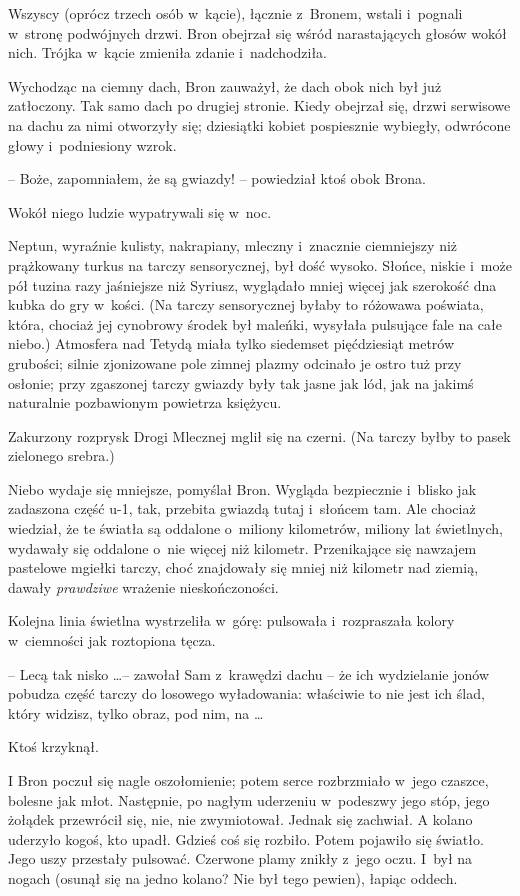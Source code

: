 \documentclass[oneside,polish,11pt,rmheadings]{mwbk}
\begin{document}
Wszyscy (oprócz trzech osób w~kącie), łącznie z~Bronem, wstali i~pognali w~stronę podwójnych drzwi. Bron obejrzał się wśród narastających głosów wokół nich. Trójka w~kącie zmieniła zdanie i~nadchodziła. 

Wychodząc na ciemny dach, Bron zauważył, że dach obok nich był już zatłoczony. Tak samo dach po drugiej stronie. Kiedy obejrzał się, drzwi serwisowe na dachu za nimi otworzyły się; dziesiątki kobiet pospiesznie wybiegły, odwrócone głowy i~podniesiony wzrok. 

-- Boże, zapomniałem, że są gwiazdy! -- powiedział ktoś obok Brona. 

Wokół niego ludzie wypatrywali się w~noc. 

Neptun, wyraźnie kulisty, nakrapiany, mleczny i~znacznie ciemniejszy niż prążkowany turkus na tarczy sensorycznej, był dość wysoko. Słońce, niskie i~może pół tuzina razy jaśniejsze niż Syriusz, wyglądało mniej więcej jak szerokość dna kubka do gry w~kości. (Na tarczy sensorycznej byłaby to różowawa poświata, która, chociaż jej cynobrowy środek był maleńki, wysyłała pulsujące fale na całe niebo.) Atmosfera nad Tetydą miała tylko siedemset pięćdziesiąt metrów grubości; silnie zjonizowane pole zimnej plazmy odcinało je ostro tuż przy osłonie; przy zgaszonej tarczy gwiazdy były tak jasne jak lód, jak na jakimś naturalnie pozbawionym powietrza księżycu. 

Zakurzony rozprysk Drogi Mlecznej mglił się na czerni. (Na tarczy byłby to pasek zielonego srebra.) 

Niebo wydaje się mniejsze, pomyślał Bron. Wygląda bezpiecznie i~blisko jak zadaszona część u-1, tak, przebita gwiazdą tutaj i~słońcem tam. Ale chociaż wiedział, że te światła są oddalone o~miliony kilometrów, miliony lat świetlnych, wydawały się oddalone o~nie więcej niż kilometr. Przenikające się nawzajem pastelowe mgiełki tarczy, choć znajdowały się mniej niż kilometr nad ziemią, dawały \textit{prawdziwe }wrażenie nieskończoności. 

Kolejna linia świetlna wystrzeliła w~górę: pulsowała i~rozpraszała kolory w~ciemności jak roztopiona tęcza. 

-- Lecą tak nisko \ldots  -- zawołał Sam z~krawędzi dachu -- że ich wydzielanie jonów pobudza część tarczy do losowego wyładowania: właściwie to nie jest ich ślad, który widzisz, tylko obraz, pod nim, na \ldots  

Ktoś krzyknął. 

I Bron poczuł się nagle oszołomienie; potem serce rozbrzmiało w~jego czaszce, bolesne jak młot. Następnie, po nagłym uderzeniu w~podeszwy jego stóp, jego żołądek przewrócił się, nie, nie zwymiotował. Jednak się zachwiał. A kolano uderzyło kogoś, kto upadł. Gdzieś coś się rozbiło. Potem pojawiło się światło. Jego uszy przestały pulsować. Czerwone plamy znikły z~jego oczu. I~był na nogach (osunął się na jedno kolano? Nie był tego pewien), łapiąc oddech. 
\end{document}
